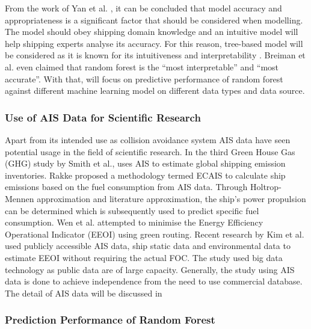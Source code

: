 From the work of Yan et al. \cite{Yan.2021}, it can be concluded that model accuracy and appropriateness is a significant factor that should be considered when modelling. The model should obey shipping domain knowledge and an intuitive model will help shipping experts analyse its accuracy. For this reason, tree-based model will be considered as it is known for its intuitiveness and interpretability \cite{Breiman.2017}. Breiman et al.\cite{Breiman.2001} even claimed that random forest is the ``most interpretable'' and ``most accurate''. With that, will focus on predictive performance of random forest against different machine learning model on different data types and data source. \\

\subsubsection{Use of AIS Data for Scientific Research}\label{ais_use}

Apart from its intended use as collision avoidance system AIS data have seen potential usage in the field of scientific research. In the third Green House Gas (GHG) study by Smith et al.\cite{T.W.P.Smith.2015}, uses AIS to estimate global shipping emission inventories. Rakke \cite{Rakke2016} proposed a methodology termed ECAIS to calculate ship emissions based on the fuel consumption from AIS data. Through Holtrop-Mennen approximation and literature approximation, the ship's power propulsion can be determined which is subsequently used to predict specific fuel consumption. Wen et al. \cite{Wen.2017} attempted to minimise the Energy Efficiency Operational Indicator (EEOI) using green routing. Recent research by Kim et al. \cite{Kim.2020b} used publicly accessible AIS data, ship static data and environmental data to estimate EEOI  without requiring the actual FOC. The study used big data technology as public data are of large capacity. Generally, the study using AIS data is done to achieve independence from the need to use commercial database. The detail of AIS data will be discussed in \\  

\subsubsection{Prediction Performance of Random Forest}\label{rf_performance}


